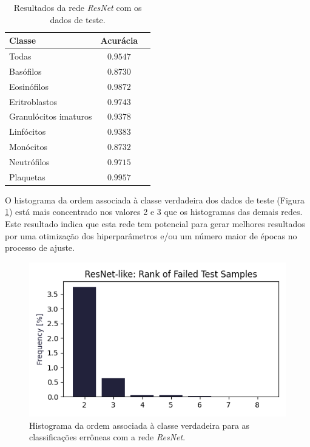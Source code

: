 \documentclass[final,5p]{elsarticle}
\numberwithin{equation}{section}
\begin{document}
    \begin{table}[h]
        \centering
        \begin{tabular}{l c c}
            \toprule
            \textbf{Classe} & \textbf{Acurácia} \\
            \midrule
            Todas & $0.9547$ \\
            \addlinespace
            Basófilos  & $0.8730$ \\
            Eosinófilos  & $0.9872$ \\
            Eritroblastos  & $0.9743$ \\
            Granulócitos imaturos  & $0.9378$ \\
            Linfócitos  & $0.9383$ \\
            Monócitos  & $0.8732$ \\
            Neutrófilos  & $0.9715$ \\
            Plaquetas  & $0.9957$ \\
            \bottomrule
        \end{tabular}
        \caption{Resultados da rede \emph{ResNet} com os dados de teste.}\label{tab:ResultadosResNet}
    \end{table}

    O histograma da ordem associada à classe verdadeira dos dados de teste (Figura \ref{fig:HistogramaErrosResNet}) está mais concentrado nos valores 2 e 3 que os histogramas das demais redes. Este resultado indica que esta rede tem potencial para gerar melhores resultados por uma otimização dos hiperparâmetros e/ou um número maior de épocas no processo de ajuste.

    \begin{figure}[hbt!]
        \includegraphics[width=0.95\columnwidth]{ResNet_rank.png}
        \caption{Histograma da ordem associada à classe verdadeira para as classificações errôneas com a rede \emph{ResNet}.}\label{fig:HistogramaErrosResNet}
    \end{figure}
\end{document}
